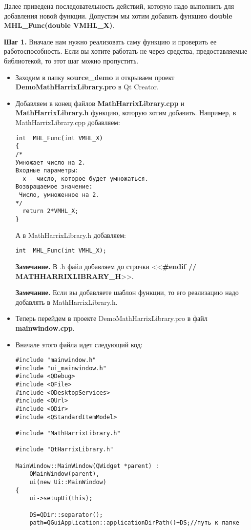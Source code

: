 \documentclass[a4paper,12pt]{article}
\begin{document}
Далее приведена последовательность действий, которую надо выполнить для добавления новой функции. Допустим мы хотим добавить функцию  \textbf{double MHL\_Func(double VMHL\_X)}.

\textbf{Шаг 1.}\label{step1} Вначале нам нужно реализовать саму функцию и проверить ее работоспособность. Если вы хотите работать не через средства, предоставляемые библиотекой, то этот шаг можно пропустить.

\begin{itemize}
\item Заходим в папку \textbf{source\_demo} и открываем проект \textbf{DemoMathHarrixLibrary.pro} в Qt Creator.
\item Добавляем в конец файлов \textbf{MathHarrixLibrary.cpp} и \textbf{MathHarrixLibrary.h} функцию, которую хотим добавить. Например, в MathHarrixLibrary.cpp добавляем:
\begin{lstlisting}[label=examplefunction01, caption=Что добавляем в MathHarrixLibrary.cpp]
int  MHL_Func(int VMHL_X)
{
/*
Умножает число на 2.
Входные параметры:
  x - число, которое будет умножаться.
Возвращаемое значение:
 Число, умноженное на 2.
*/
  return 2*VMHL_X;
}
\end{lstlisting}
А в MathHarrixLibrary.h добавляем:
\begin{lstlisting}[label=examplefunction02, caption=Что добавляем в MathHarrixLibrary.h]
int  MHL_Func(int VMHL_X);
\end{lstlisting}
\textbf{Замечание.} В .h файл добавляем до строчки <<\textbf{\#endif // MATHHARRIXLIBRARY\_H}>>.

\textbf{Замечание.} Если вы добавляете шаблон функции, то его реализацию надо добавлять в MathHarrixLibrary.h.
\item Теперь перейдем в проекте DemoMathHarrixLibrary.pro в файл \textbf{mainwindow.cpp}.
\item Вначале этого файла идет следующий код:
\begin{lstlisting}[label=examplefunction03, caption=mainwindow.cpp]
#include "mainwindow.h"
#include "ui_mainwindow.h"
#include <QDebug>
#include <QFile>
#include <QDesktopServices>
#include <QUrl>
#include <QDir>
#include <QStandardItemModel>

#include "MathHarrixLibrary.h"

#include "QtHarrixLibrary.h"

MainWindow::MainWindow(QWidget *parent) :
    QMainWindow(parent),
    ui(new Ui::MainWindow)
{
    ui->setupUi(this);

    DS=QDir::separator();
    path=QGuiApplication::applicationDirPath()+DS;//путь к папке


\end{lstlisting}
\end{itemize}
\end{document}
